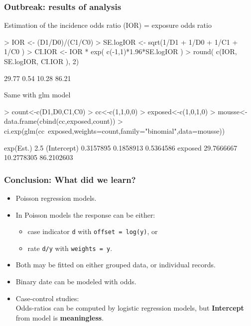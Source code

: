 \documentclass[handout,12pt,dvipsnames,t]{beamer}
\begin{document}
\begin{frame}[fragile]
\frametitle{Outbreak: results of analysis}

Estimation of the incidence odds ratio (IOR) = exposure odds ratio 

\scriptsize{
\begin{Schunk}
\begin{Sinput}
> IOR <- (D1/D0)/(C1/C0)
> SE.logIOR <- sqrt(1/D1 + 1/D0 + 1/C1 + 1/C0 )
> CI.IOR <- IOR * exp( c(-1,1)*1.96*SE.logIOR )
> round( c(IOR, SE.logIOR, CI.IOR ), 2)
\end{Sinput}
\begin{Soutput}
[1] 29.77  0.54 10.28 86.21
\end{Soutput}
\end{Schunk}
}

\normalsize
Same with glm model

\scriptsize{
\begin{Schunk}
\begin{Sinput}
> count<-c(D1,D0,C1,C0)
> cc<-c(1,1,0,0)
> exposed<-c(1,0,1,0)
> mousse<-data.frame(cbind(cc,exposed,count))
> ci.exp(glm(cc~exposed,weights=count,family="binomial",data=mousse))
\end{Sinput}
\begin{Soutput}
             exp(Est.)       2.5%
(Intercept)  0.3157895  0.1858913  0.5364586
exposed     29.7666667 10.2778305 86.2102603
\end{Soutput}
\end{Schunk}
}
\end{frame}

\begin{frame}
\frametitle{Conclusion: What did we learn?}
\begin{itemize} %
\item Poisson regression models.
\item In Poisson models the response can be either:
  \begin{itemize}
    \item case indicator {\tt d} with {\tt offset = log(y)}, or
    \item rate {\tt d/y} with {\tt weights = y}.
  \end{itemize}
\item Both may be fitted on either grouped data, or individual
  records.
\item Binary date can be modeled with odds.
\item Case-control studies:\\
  Odds-ratios can be computed by logistic
  regression models, but \textbf{Intercept} from model is \textbf{meaningless}.
\end{itemize}
\end{frame}
\end{document}
